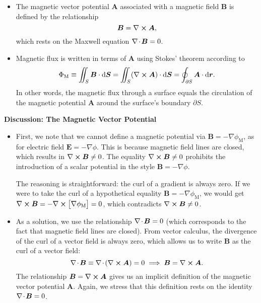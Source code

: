 \documentclass[11pt, a4paper]{article}
\newcommand{\diff}{\mathop{}\!\mathrm{d}} %
\renewcommand{\vec}[1]{\bm{#1}} %
\renewcommand{\r}{\vec{r}}
\newcommand{\E}{\vec{E}} %
\newcommand{\B}{\vec{B}} %
\newcommand{\A}{\vec{A}} %
\renewcommand{\div}{\nabla \mspace{-2mu} \cdot \mspace{-2mu}}
\renewcommand{\curl}{\nabla \cross}
\renewcommand{\grad}{\nabla}
\begin{document}
\begin{itemize}
    \item The magnetic vector potential $ \A $ associated with a magnetic field $ \B $ is defined by the relationship
    \begin{equation*}
        \B = \curl \A,
    \end{equation*}
    which rests on the Maxwell equation $ \div \B = 0 $.
    
	\item Magnetic flux is written in terms of $ \A $ using Stokes' theorem according to
	\begin{equation*}
		\Phi_{\text{M}} \equiv \iint_{S}\B \cdot \diff \vec{S} = \iint_{S} (\curl \A) \cdot \diff \vec{S} = \oint_{\partial S} \A \cdot \diff \r.
	\end{equation*}
	In other words, the magnetic flux through a surface equals the circulation of the magnetic potential $ \A $ around the surface's boundary $ \partial S $.

\end{itemize}

\textbf{Discussion: The Magnetic Vector Potential}
\begin{itemize}
	
    \item First, we note that we cannot define a magnetic potential via $ \B = - \grad \phi_{\text{M}} $, as for electric field $ \E = - \grad \phi $. This is because magnetic field lines are closed, which results in $ \curl \B \neq 0 $. The equality $ \curl \B \neq 0 $ prohibits the introduction of a scalar potential in the style $ \B = - \grad \phi $.

    The reasoning is straightforward: the curl of a gradient is always zero. If we were to take the curl of a hypothetical equality $ \B = - \grad \phi_{\text{M}} $, we would get $ \curl \B = - \curl \big[ \grad \phi_{\text{M}} \big] = 0 $, which contradicts $ \curl \B \neq 0 $. 
	
	\item As a solution, we use the relationship $ \div \B = 0 $ (which corresponds to the fact that magnetic field lines are closed). From vector calculus, the divergence of the curl of a vector field is always zero, which allows us to write $ \B $ as the curl of a vector field:
	\begin{equation*}
		\div \B \equiv \div \left(\curl \A\right) = 0 \implies \B = \curl \A. 
	\end{equation*}
    The relationship $ \B = \curl \A $ gives us an implicit definition of the magnetic vector potential $ \A $. Again, we stress that this definition rests on the identity $ \div \B = 0 $. 
	
\end{itemize}
\end{document}
